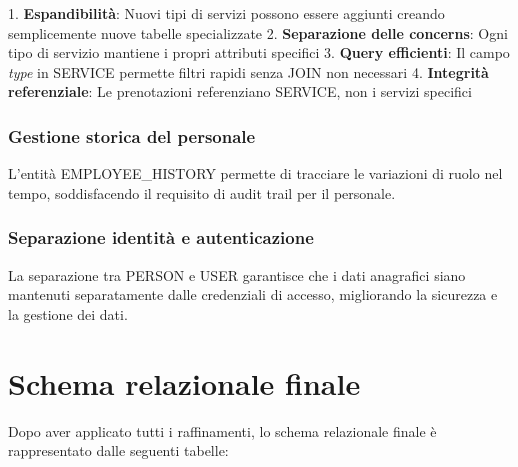 \documentclass[a4paper,12pt]{report}
\begin{document}
1. \textbf{Espandibilità}: Nuovi tipi di servizi possono essere aggiunti creando semplicemente nuove tabelle specializzate
2. \textbf{Separazione delle concerns}: Ogni tipo di servizio mantiene i propri attributi specifici
3. \textbf{Query efficienti}: Il campo \textit{type} in SERVICE permette filtri rapidi senza JOIN non necessari
4. \textbf{Integrità referenziale}: Le prenotazioni referenziano SERVICE, non i servizi specifici

\subsubsection{Gestione storica del personale}

L'entità EMPLOYEE\_HISTORY permette di tracciare le variazioni di ruolo nel tempo, soddisfacendo il requisito di audit trail per il personale.

\subsubsection{Separazione identità e autenticazione}

La separazione tra PERSON e USER garantisce che i dati anagrafici siano mantenuti separatamente dalle credenziali di accesso, migliorando la sicurezza e la gestione dei dati.

\section{Schema relazionale finale}

Dopo aver applicato tutti i raffinamenti, lo schema relazionale finale è rappresentato dalle seguenti tabelle:
\end{document}

